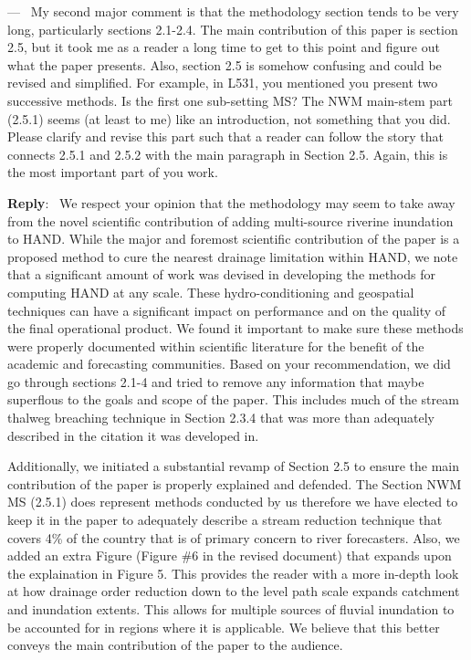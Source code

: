 \documentclass[11pt]{article}
\newcounter{reviewer}
\newcounter{point}[reviewer]
\renewcommand{\thepoint}{P\,\thereviewer.\arabic{point}}
\newenvironment{point}
   {\refstepcounter{point} \bigskip \noindent {\textbf{Reviewer~Point~\thepoint} } ---\ }
   {\par }
\newenvironment{reply}
   {\medskip \noindent \begin{sf}\textbf{Reply}:\  }
   {\medskip \end{sf}}
\begin{document}
\begin{point}
My second major comment is that the methodology section tends to be very long, particularly sections 2.1-2.4.
The main contribution of this paper is section 2.5, but it took me as a reader a long time to get to this point and figure out what the paper presents.
Also, section 2.5 is somehow confusing and could be revised and simplified.
For example, in L531, you mentioned you present two successive methods.
Is the first one sub-setting MS?
The NWM main-stem part (2.5.1) seems (at least to me) like an introduction, not something that you did.
Please clarify and revise this part such that a reader can follow the story that connects 2.5.1 and 2.5.2 with the main paragraph in Section 2.5.
Again, this is the most important part of you work. 
\label{pt:bar}
\end{point}

\begin{reply}
We respect your opinion that the methodology may seem to take away from the novel scientific contribution of adding multi-source riverine inundation to HAND.
While the major and foremost scientific contribution of the paper is a proposed method to cure the nearest drainage limitation within HAND, we note that a significant amount of work was devised in developing the methods for computing HAND at any scale.
These hydro-conditioning and geospatial techniques can have a significant impact on performance and on the quality of the final operational product.
We found it important to make sure these methods were properly documented within scientific literature for the benefit of the academic and forecasting communities.
Based on your recommendation, we did go through sections 2.1-4 and tried to remove any information that maybe superflous to the goals and scope of the paper.
This includes much of the stream thalweg breaching technique in Section 2.3.4 that was more than adequately described in the citation it was developed in.

Additionally, we initiated a substantial revamp of Section 2.5 to ensure the main contribution of the paper is properly explained and defended.
The Section NWM MS (2.5.1) does represent methods conducted by us therefore we have elected to keep it in the paper to adequately describe a stream reduction technique that covers 4\% of the country that is of primary concern to river forecasters.
Also, we added an extra Figure (Figure \#6 in the revised document) that expands upon the explaination in Figure 5. 
This provides the reader with a more in-depth look at how drainage order reduction down to the level path scale expands catchment and inundation extents.
This allows for multiple sources of fluvial inundation to be accounted for in regions where it is applicable.
We believe that this better conveys the main contribution of the paper to the audience.
\end{reply}
\end{document}
